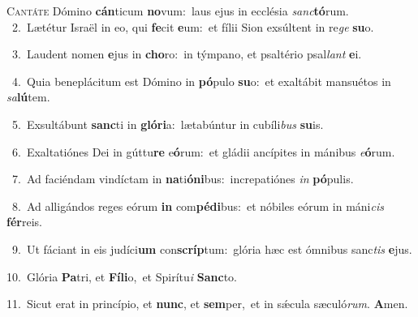 \lettrine{\initial\textcolor{\initialcolor}{C}}{antáte} Dómino \textbf{cán}\-ticum \textbf{no}\-vum:~\star laus ejus in ecclésia \textit{sanc}\-\textbf{tó}rum.\\
{\numbfont\textcolor{\numbcolor}{~2.}}~Lætétur Israël in eo, qui \textbf{fe}\-cit \textbf{e}\-um:~\star et fílii Sion exsúltent in re\textit{ge} \textbf{su}\-o.\par
{\numbfont\textcolor{\numbcolor}{~3.}}~Laudent nomen \textbf{e}\-jus in \textbf{cho}\-ro:~\star in týmpano, et psaltério psal\textit{lant} \textbf{e}\-i.\par
{\numbfont\textcolor{\numbcolor}{~4.}}~Quia beneplácitum est Dómino in \textbf{pó}\-pulo \textbf{su}\-o:~\star et exaltábit mansuétos in \textit{sa}\-\textbf{lú}tem.\par
{\numbfont\textcolor{\numbcolor}{~5.}}~Exsultábunt \textbf{sanc}\-ti in \textbf{gló}\-\textbf{ri}a:~\star lætabúntur in cubíli\textit{bus} \textbf{su}\-is.\par
{\numbfont\textcolor{\numbcolor}{~6.}}~Exaltatiónes Dei in gúttu\textbf{re} e\-\textbf{ó}\-rum:~\star et gládii ancípites in mánibus \textit{e}\-\textbf{ó}rum.\par
{\numbfont\textcolor{\numbcolor}{~7.}}~Ad faciéndam vindíctam in \textbf{na}\-ti\-\textbf{ó}\-\textbf{ni}bus:~\star increpatiónes \textit{in} \textbf{pó}\-pulis.\par
{\numbfont\textcolor{\numbcolor}{~8.}}~Ad alligándos reges eórum \textbf{in} com\-\textbf{pé}\-\textbf{di}bus:~\star et nóbiles eórum in máni\textit{cis} \textbf{fér}\-reis.\par
{\numbfont\textcolor{\numbcolor}{~9.}}~Ut fáciant in eis judíci\textbf{um} con\-\textbf{scríp}\-tum:~\star glória hæc est ómnibus sanc\textit{tis} \textbf{e}\-jus.\par
{\numbfont\textcolor{\numbcolor}{10.}}~Glória \textbf{Pa}\-tri, et \textbf{Fí}\-\textbf{li}o,~\star et Spirítu\textit{i} \textbf{Sanc}\-to.\par
{\numbfont\textcolor{\numbcolor}{11.}}~Sicut erat in princípio, et \textbf{nunc}\-, et \textbf{sem}\-per,~\star et in sǽcula sæculó\-\textit{rum}\-. \textbf{A}\-men.\par
